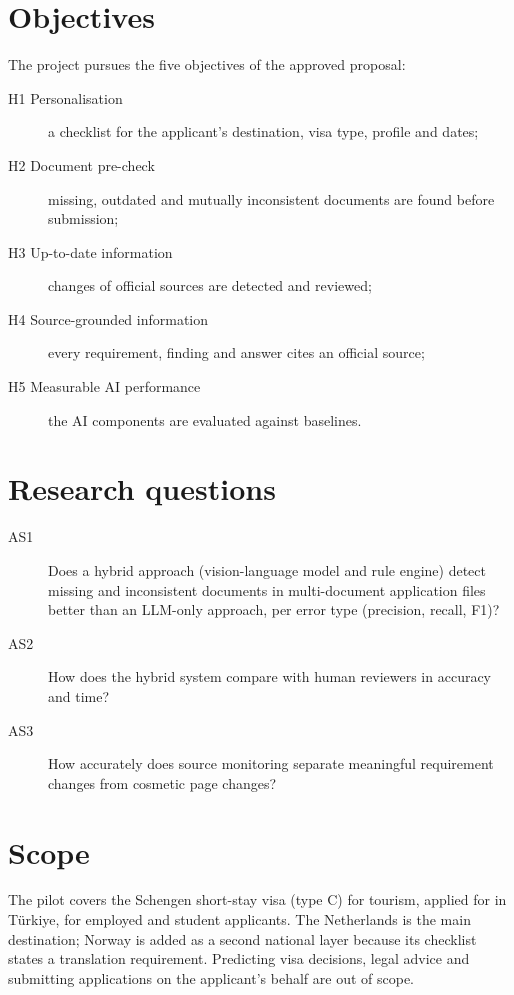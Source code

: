 \section{Objectives}
The project pursues the five objectives of the approved proposal:
\begin{description}
  \item[H1 Personalisation] a checklist for the applicant's destination, visa type, profile and dates;
  \item[H2 Document pre-check] missing, outdated and mutually inconsistent documents are found before submission;
  \item[H3 Up-to-date information] changes of official sources are detected and reviewed;
  \item[H4 Source-grounded information] every requirement, finding and answer cites an official source;
  \item[H5 Measurable AI performance] the AI components are evaluated against baselines.
\end{description}

\section{Research questions}\label{sec:rq}
\begin{description}
  \item[AS1] Does a hybrid approach (vision-language model and rule engine) detect missing and
    inconsistent documents in multi-document application files better than an LLM-only approach,
    per error type (precision, recall, F1)?
  \item[AS2] How does the hybrid system compare with human reviewers in accuracy and time?
  \item[AS3] How accurately does source monitoring separate meaningful requirement changes from
    cosmetic page changes?
\end{description}

\section{Scope}
The pilot covers the Schengen short-stay visa (type C) for tourism, applied for in Türkiye, for
employed and student applicants. The Netherlands is the main destination; Norway is added as a
second national layer because its checklist states a translation requirement. Predicting visa
decisions, legal advice and submitting applications on the applicant's behalf are out of scope.

